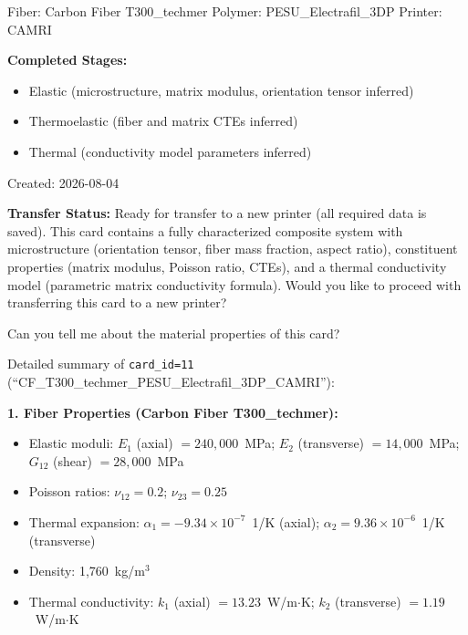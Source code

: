 \documentclass[preprint,review,10pt,number]{elsarticle}
\begin{document}
\begin{center}
\begin{tcolorbox}
\begin{tcolorbox}
Fiber: Carbon Fiber T300\_techmer \quad Polymer: PESU\_Electrafil\_3DP \quad Printer: CAMRI
\vspace{4pt}

\textbf{Completed Stages:}
\begin{itemize}[leftmargin=1.2em, itemsep=0pt, topsep=2pt]
\item Elastic (microstructure, matrix modulus, orientation tensor inferred)
\item Thermoelastic (fiber and matrix CTEs inferred)
\item Thermal (conductivity model parameters inferred)
\end{itemize}
Created: 2026-08-04
\vspace{4pt}

\textbf{Transfer Status:} Ready for transfer to a new printer (all required data is saved). This card contains a fully characterized composite system with microstructure (orientation tensor, fiber mass fraction, aspect ratio), constituent properties (matrix modulus, Poisson ratio, CTEs), and a thermal conductivity model (parametric matrix conductivity formula). Would you like to proceed with transferring this card to a new printer?
\end{tcolorbox}

\vspace{8pt}
\begin{tcolorbox}[
    breakable,
    colback=gray!8, colframe=gray!60, boxrule=0.5pt, arc=2pt,
    left=6pt, right=6pt, top=4pt, bottom=4pt,
    title={\textbf{User}}, fonttitle=\small\bfseries, coltitle=black
]
\small
Can you tell me about the material properties of this card?
\end{tcolorbox}
\vspace{4pt}
\begin{tcolorbox}[
    breakable,
    colback=gray!3, colframe=gray!40, boxrule=0.5pt, arc=2pt,
    left=6pt, right=6pt, top=4pt, bottom=4pt,
    title={\textbf{\texttt{MateriAl}} \hfill \texttt{\footnotesize\textcolor{gray!70!black}{\ding{110}\ get\_card\_status}}},
    fonttitle=\small\bfseries, coltitle=black
]
\small
Detailed summary of \texttt{card\_id=11} (``CF\_T300\_techmer\_PESU\_Electrafil\_3DP\_CAMRI''):
\vspace{4pt}

\textbf{1. Fiber Properties (Carbon Fiber T300\_techmer):}
\begin{itemize}[leftmargin=1.2em, itemsep=0pt, topsep=2pt]
\item Elastic moduli: $E_1$ (axial) $= 240{,}000$~MPa; $E_2$ (transverse) $= 14{,}000$~MPa; $G_{12}$ (shear) $= 28{,}000$~MPa
\item Poisson ratios: $\nu_{12} = 0.2$; $\nu_{23} = 0.25$
\item Thermal expansion: $\alpha_1 = -9.34\times10^{-7}$~1/K (axial); $\alpha_2 = 9.36\times10^{-6}$~1/K (transverse)
\item Density: 1{,}760~kg/m$^3$
\item Thermal conductivity: $k_1$ (axial) $= 13.23$~W/m$\cdot$K; $k_2$ (transverse) $= 1.19$~W/m$\cdot$K
\end{itemize}


\end{tcolorbox}
\end{tcolorbox}
\end{center}
\end{document}
